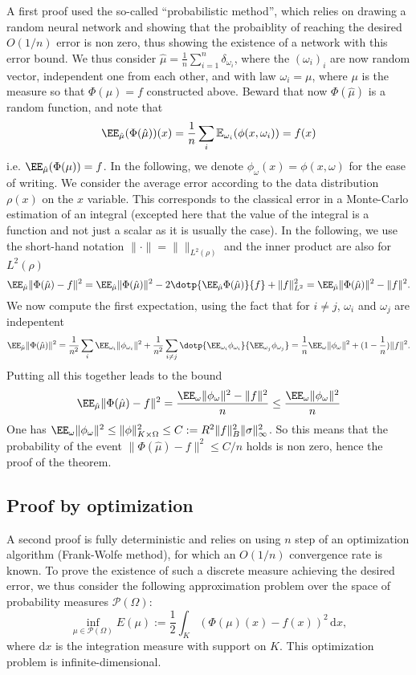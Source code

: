 A first proof used the so-called ``probabilistic method'', which relies on drawing a random neural network and showing that the probaiblity of reaching the desired $O(1/n)$ error is non zero, thus showing the existence of a network with this error bound. We thus consider $\hat \mu = \frac{1}{n}\sum_{i=1}^n \delta_{\omega_i}$, where the $(\omega_i)_i$ are now random vector, independent one from each other, and with law $\omega_i = \mu$, where $\mu$ is the measure so that $\Phi(\mu)=f$ constructed above.
%
Beward that now $\Phi(\hat \mu)$ is a random function, and note that 
$$
	\EE_{\hat \mu}(\Phi(\hat\mu))(x) = \frac{1}{n} \sum_i \mathbb{E}_{\omega_i}( \phi(x,\omega_i) )  = f(x)
$$
i.e. $\EE_{\hat \mu}(\Phi(\mu)) = f$. In the following, we denote $\phi_\omega(x) = \phi(x,\omega)$ for the ease of writing. We consider the average error according to the data distribution $\rho(x)$ on the $x$ variable. This corresponds to the classical error in a Monte-Carlo estimation of an integral (excepted here that the value of the integral is a function and not just a scalar as it is usually the case). In the following, we use the short-hand notation $\|\cdot\| = \|\|_{L^2(\rho)}$ and the inner product are also for $L^2(\rho)$
$$
	\EE_{\hat\mu} \|\Phi(\hat \mu) - f\|^2 = \EE_{\hat\mu} \|\Phi(\hat \mu)\|^2 - 2 \dotp{ \EE_{\hat\mu} \Phi(\hat \mu) }{ f } + \|f\|_{L^2}^2
	 = \EE_{\hat\mu} \|\Phi(\hat \mu)\|^2 - \|f\|^2.
$$
We now compute the first expectation, using the fact that for $i \neq j$, $\omega_i$ and $\omega_j$ are indepentent 
$$
	\EE_{\hat\mu} \|\Phi(\hat \mu)\|^2 = \frac{1}{n^2}\sum_{i} \EE_{\omega_i} \|\phi_{\omega_i}\|^2 + \frac{1}{n^2}\sum_{i \neq j}
		\dotp{ \EE_{\omega_i} \phi_{\omega_i} }{ \EE_{\omega_j} \phi_{\omega_j} }
	= \frac{1}{n} \EE_{\omega} \|\phi_{\omega}\|^2  + (1-\frac{1}{n}) \|f\|^2.
$$
Putting all this together leads to the bound
$$
	\EE_{\hat\mu} \|\Phi(\hat \mu) - f\|^2 = \frac{ \EE_{\omega} \|\phi_{\omega}\|^2 - \|f\|^2}{n}
	\leq \frac{ \EE_{\omega} \|\phi_{\omega}\|^2 }{n}
$$
One has $\EE_{\omega} \|\phi_{\omega}\|^2 \leq \|\phi\|_{K \times \Omega}^2 \leq C := R^2 \|f\|_B^2 \|\sigma\|_\infty^2$. 
So this means that the probability of the event $\|\Phi(\hat \mu) - f\|^2 \leq C/n$ holds is non zero, hence the proof of the theorem. 

\subsection{Proof by optimization}

A second proof is fully deterministic and relies on using $n$ step of an optimization algorithm (Frank-Wolfe method), for which an $O(1/n)$ convergence rate is known.
%
To prove the existence of such a discrete measure achieving the desired error, we thus consider the following approximation problem over the space of probability measures $\mathcal{P}(\Omega)$:
\begin{equation}\label{eq:mlp-optim-convex}
	\inf_{\mu \in \mathcal{P}(\Omega)} E(\mu) := \frac{1}{2} \int_K \left( \Phi(\mu)(x) - f(x) \right)^2 \, \mathrm{d}x,
\end{equation}
where $\mathrm{d}x$ is the integration measure with support on $K$. This optimization problem is infinite-dimensional. 

